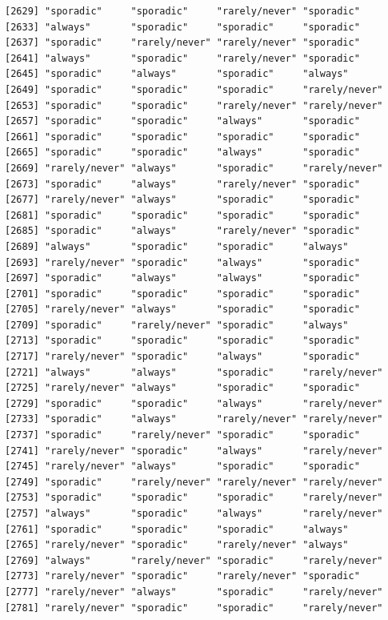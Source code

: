 \documentclass[
  letterpaper,
  DIV=11,
  numbers=noendperiod]{scrartcl}
\begin{document}
\begin{verbatim}
[2629] "sporadic"     "sporadic"     "rarely/never" "sporadic"    
[2633] "always"       "sporadic"     "sporadic"     "sporadic"    
[2637] "sporadic"     "rarely/never" "rarely/never" "sporadic"    
[2641] "always"       "sporadic"     "rarely/never" "sporadic"    
[2645] "sporadic"     "always"       "sporadic"     "always"      
[2649] "sporadic"     "sporadic"     "sporadic"     "rarely/never"
[2653] "sporadic"     "sporadic"     "rarely/never" "rarely/never"
[2657] "sporadic"     "sporadic"     "always"       "sporadic"    
[2661] "sporadic"     "sporadic"     "sporadic"     "sporadic"    
[2665] "sporadic"     "sporadic"     "always"       "sporadic"    
[2669] "rarely/never" "always"       "sporadic"     "rarely/never"
[2673] "sporadic"     "always"       "rarely/never" "sporadic"    
[2677] "rarely/never" "always"       "sporadic"     "sporadic"    
[2681] "sporadic"     "sporadic"     "sporadic"     "sporadic"    
[2685] "sporadic"     "always"       "rarely/never" "sporadic"    
[2689] "always"       "sporadic"     "sporadic"     "always"      
[2693] "rarely/never" "sporadic"     "always"       "sporadic"    
[2697] "sporadic"     "always"       "always"       "sporadic"    
[2701] "sporadic"     "sporadic"     "sporadic"     "sporadic"    
[2705] "rarely/never" "always"       "sporadic"     "sporadic"    
[2709] "sporadic"     "rarely/never" "sporadic"     "always"      
[2713] "sporadic"     "sporadic"     "sporadic"     "sporadic"    
[2717] "rarely/never" "sporadic"     "always"       "sporadic"    
[2721] "always"       "always"       "sporadic"     "rarely/never"
[2725] "rarely/never" "always"       "sporadic"     "sporadic"    
[2729] "sporadic"     "sporadic"     "always"       "rarely/never"
[2733] "sporadic"     "always"       "rarely/never" "rarely/never"
[2737] "sporadic"     "rarely/never" "sporadic"     "sporadic"    
[2741] "rarely/never" "sporadic"     "always"       "rarely/never"
[2745] "rarely/never" "always"       "sporadic"     "sporadic"    
[2749] "sporadic"     "rarely/never" "rarely/never" "rarely/never"
[2753] "sporadic"     "sporadic"     "sporadic"     "rarely/never"
[2757] "always"       "sporadic"     "always"       "rarely/never"
[2761] "sporadic"     "sporadic"     "sporadic"     "always"      
[2765] "rarely/never" "sporadic"     "rarely/never" "always"      
[2769] "always"       "rarely/never" "sporadic"     "rarely/never"
[2773] "rarely/never" "sporadic"     "rarely/never" "sporadic"    
[2777] "rarely/never" "always"       "sporadic"     "rarely/never"
[2781] "rarely/never" "sporadic"     "sporadic"     "rarely/never"

\end{verbatim}
\end{document}
